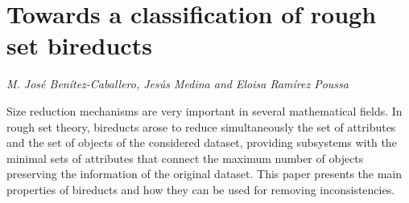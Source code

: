 \documentclass[../booklet.tex]{subfiles}
\begin{document}
\section[Towards a classification of rough set bireducts. {\it M. José Benítez-Caballero, Jesús Medina and Eloisa Ramírez Poussa}]{Towards a classification of rough set bireducts}
  

\begin{center}
  {\it M. José Benítez-Caballero, Jesús Medina and Eloisa Ramírez Poussa}
\end{center}

\vskip 0.8cm


Size reduction mechanisms are very important  in several mathematical fields. In rough set theory, bireducts arose to reduce  simultaneously  the set of attributes and the set of objects of the considered dataset, providing subsystems with the minimal sets of attributes that connect the maximum number of objects preserving the information of the original dataset. This paper   presents the main properties of bireducts and how they can be used  for removing inconsistencies. 
\end{document}

